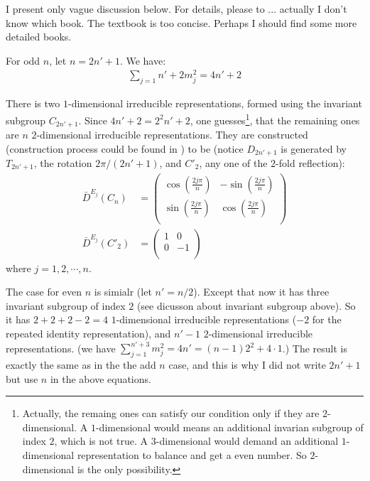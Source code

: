 I present only vague discussion below. For details, please to ...
actually I don't know which book. The textbook \cite{book} is too
concise. Perhaps I should find some more detailed books.

For odd $n$, let $n=2n'+1$. We have:
\begin{align}
    \sum_{j=1}{n'+2} m_j^2 = 4n'+2
\end{align}

There is two $1$-dimensional irreducible representations, formed using
the invariant subgroup $C_{2n'+1}$. Since $4n'+2 = 2^2 n'+2$, one
guesses\footnote{Actually, the remaing ones can satisfy our condition
    only if they are $2$-dimensional. A $1$-dimensional would means an
    additional invarian subgroup of index $2$, which is not true. A
    $3$-dimensional would demand an additional $1$-dimensional
    representation to balance and get a even number. So
$2$-dimensional is the only possibility.}, that the remaining ones are
$n$ $2$-dimensional irreducible representations. They are constructed
(construction process could be found in \cite{book}) to be (notice
$D_{2n'+1}$ is generated by $T_{2n'+1}$, the rotation
$2\pi/(2n'+1)$, and $C'_2$, any one of the $2$-fold reflection):
\begin{align}
    \bar{D}^{E_j}(C_{n}) &=\left( \begin{array}{cc}
    \cos(\frac{2j\pi}{n}) & -\sin(\frac{2j\pi}{n}) \\
    \sin(\frac{2j\pi}{n}) & \cos(\frac{2j\pi}{n}) \\
        \end{array} \right) \\
    \bar{D}^{E_j}(C'_{2}) &= \left( \begin{array}{cc}
                 1 & 0 \\
                 0 & -1 \\ 
                 \end{array} \right)
\end{align}
where $j=1,2,\cdots,n$.

The case for even $n$ is simialr (let $n'=n/2$). Except that now it
has three invariant subgroup of index $2$ (see dicusson about invariant
subgroup above). So it has $2+2+2-2=4$ $1$-dimensional irreducible
representations ($-2$ for the repeated identity representation), and
$n'-1$ $2$-dimensional irreducible representations.
(we have $\sum_{j=1}^{n'+3}m_j^2 = 4n' = (n-1)2^2 + 4\cdot 1$.)
The result is exactly the same as in the the add $n$ case, and this is
why I did not write $2n'+1$ but use $n$ in the above equations.

